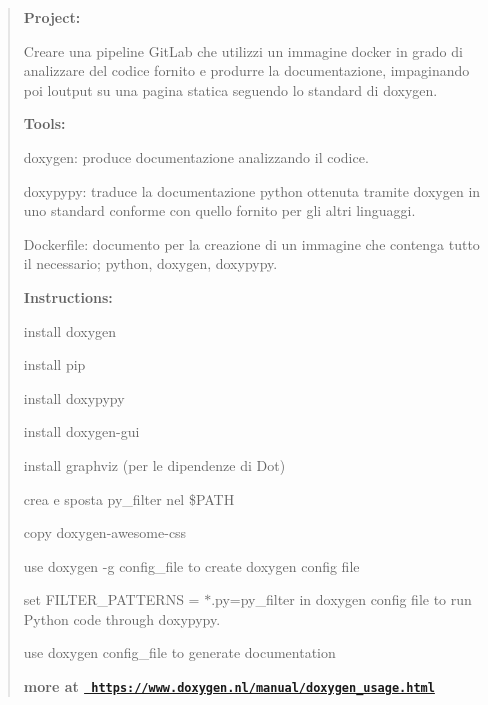 \begin{quote}
{\bfseries{Project\+:}}
\begin{DoxyItemize}
\item Creare una pipeline Git\+Lab che utilizzi un immagine docker in grado di analizzare del codice fornito e produrre la documentazione, impaginando poi l\textquotesingle{}output su una pagina statica seguendo lo standard di doxygen.
\end{DoxyItemize}

{\bfseries{Tools\+:}}


\begin{DoxyItemize}
\item doxygen\+: produce documentazione analizzando il codice.
\item doxypypy\+: traduce la documentazione python ottenuta tramite doxygen in uno standard conforme con quello fornito per gli altri linguaggi.
\item Dockerfile\+: documento per la creazione di un immagine che contenga tutto il necessario; python, doxygen, doxypypy.
\item {\bfseries{Instructions\+:}}
\begin{DoxyItemize}
\item install doxygen
\item install pip
\item install doxypypy
\item install doxygen-\/gui
\item install graphviz (per le dipendenze di Dot)
\item crea e sposta py\+\_\+filter nel \$\+PATH 
\begin{DoxyCode}{0}

\end{DoxyCode}

\item copy doxygen-\/awesome-\/css 
\begin{DoxyCode}{0}

\end{DoxyCode}

\item use doxygen -\/g config\+\_\+file to create doxygen config file
\item set FILTER\+\_\+\+PATTERNS = $\ast$.py=py\+\_\+filter in doxygen config file to run Python code through doxypypy.
\item use doxygen config\+\_\+file to generate documentation
\end{DoxyItemize}
\item {\bfseries{more at \href{https://www.doxygen.nl/manual/doxygen_usage.html}{\texttt{ https\+://www.\+doxygen.\+nl/manual/doxygen\+\_\+usage.\+html}}}} 
\end{DoxyItemize}\end{quote}
